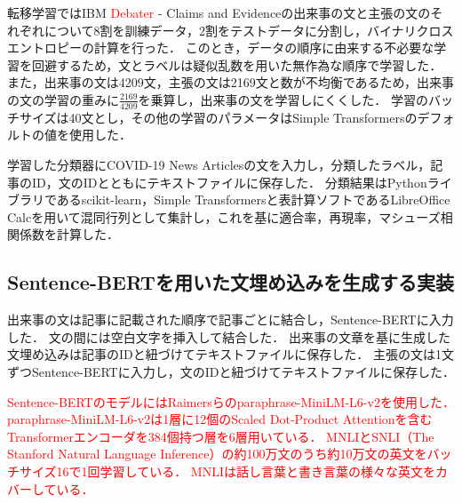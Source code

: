 \documentclass[12pt,a4j]{jreport}
\begin{document}
転移学習ではIBM \textcolor{red}{Debater} - Claims and Evidenceの出来事の文と主張の文のそれぞれについて8割を訓練データ，2割をテストデータに分割し，バイナリクロスエントロピーの計算を行った．
このとき，データの順序に由来する不必要な学習を回避するため，文とラベルは疑似乱数を用いた無作為な順序で学習した\cite{aurellen20}．
また，出来事の文は4209文，主張の文は2169文と数が不均衡であるため，出来事の文の学習の重みに$\frac{2169}{4209}$を乗算し，出来事の文を学習しにくくした．
学習のバッチサイズは40文とし，その他の学習のパラメータはSimple Transformersのデフォルトの値を使用した．


学習した分類器にCOVID-19 News Articlesの文を入力し，分類したラベル，記事のID，文のIDとともにテキストファイルに保存した．
分類結果はPythonライブラリであるscikit-learn，Simple Transformersと表計算ソフトであるLibreOffice Calcを用いて混同行列として集計し，これを基に適合率，再現率，マシューズ相関係数を計算した．

\subsection{Sentence-BERTを用いた文埋め込みを生成する実装}
出来事の文は記事に記載された順序で記事ごとに結合し，Sentence-BERTに入力した．
文の間には空白文字を挿入して結合した．
出来事の文章を基に生成した文埋め込みは記事のIDと紐づけてテキストファイルに保存した．
主張の文は1文ずつSentence-BERTに入力し，文のIDと紐づけてテキストファイルに保存した．


\textcolor{red}{
Sentence-BERTのモデルにはRaimersらのparaphrase-MiniLM-L6-v2を使用した\cite{reimers_sentence-bert_2019}．
paraphrase-MiniLM-L6-v2は1層に12個のScaled Dot-Product Attentionを含むTransformerエンコーダを384個持つ層を6層用いている．
MNLIとSNLI（The Stanford Natural Language Inference）の約100万文のうち約10万文の英文をバッチサイズ16で1回学習している．
MNLIは話し言葉と書き言葉の様々な英文をカバーしている．
}
\end{document}
